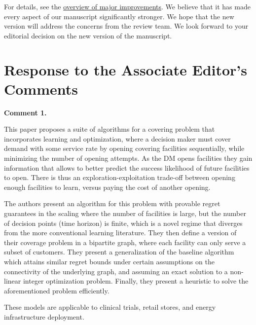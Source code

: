 \documentclass[11pt]{article}
\begin{document}
For details, see the \hyperref[sec:overview]{\color{blue}overview of major improvements}. We believe that it has made every aspect of our manuscript significantly stronger. We hope that the new version will address the concerns from the review team. We look forward to your editorial decision on the new version of the manuscript.

\newpage
\section*{Response to the Associate Editor's Comments}

\begin{commentBox}
\textbf{Comment 1.}\label{AE:1}

This paper proposes a suite of algorithms for a covering problem that incorporates learning and optimization, where a decision maker must cover demand with some service rate by opening covering facilities sequentially, while minimizing the number of opening attempts. As the DM opens facilities they gain information that allows to better predict the success likelihood of future facilities to open. There is thus an exploration-exploitation trade-off between opening enough facilities to learn, versus paying the cost of another opening.

The authors present an algorithm for this problem with provable regret guarantees in the scaling where the number of facilities is large, but the number of decision points (time horizon) is finite, which is a novel regime that diverges from the more conventional learning literature. They then define a version of their coverage problem in a bipartite graph, where each facility can only serve a subset of customers. They present a generalization of the baseline algorithm which attains similar regret bounds under certain assumptions on the connectivity of the underlying graph, and assuming an exact solution to a non-linear integer optimization problem. Finally, they present a heuristic to solve the aforementioned problem efficiently.

These models are applicable to clinical trials, retail stores, and energy infrastructure deployment.
\end{commentBox}
\end{document}
